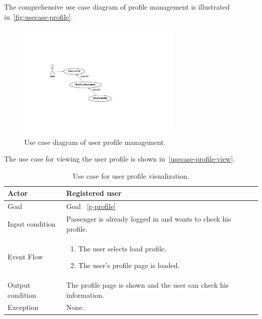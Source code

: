 The comprehensive use case diagram of profile management is illustrated in~\autoref{fig:usecase-profile}.
\begin{figure}
\begin{center}
\includegraphics[width=0.7\textwidth]{diagrams/usecase_profile.pdf}
\caption{Use case diagram of user profile management.}
\label{fig:usecase-profile}
\end{center}
\end{figure}

The use case for viewing the user profile is shown in~\autoref{usecase-profile-view}.

\begin{table}
\begin{center}
\begin{tabular}{| l | p{} |}
\hline
Actor & Registered user \\
\hline
Goal & Goal ~\ref{g-profile}
\\
\hline
Input condition & Passenger is already logged in and wants to check his profile.  \\
\hline
Event Flow & \begin{enumerate}
	\item The user selects load profile.
	\item The user's profile page is loaded.
	\end{enumerate}
\\
\hline
Output condition & The profile page is shown and the user can check his information. \\
\hline

Exception & None. \\
\hline
\end{tabular}
\end{center}
\caption{Use case for user profile visualization.}
\label{usecase-profile-view}
\end{table}


